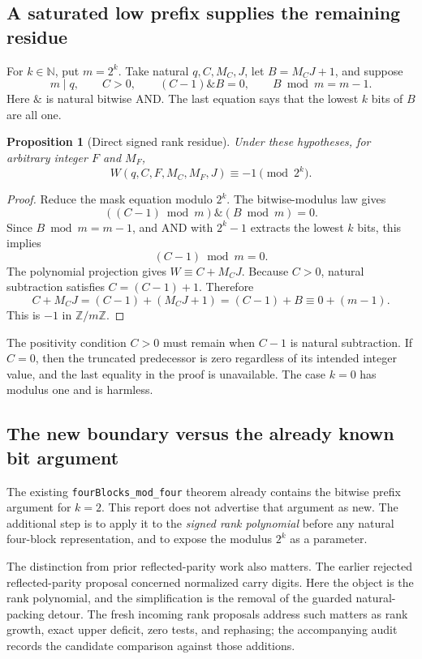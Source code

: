 \documentclass[11pt,a4paper]{article}
\newcommand{\code}[1]{\texttt{#1}}
\newtheorem{proposition}{Proposition}[section]
\begin{document}
\subsection{A saturated low prefix supplies the remaining residue}

For \(k\in\mathbb N\), put \(m=2^k\). Take natural \(q,C,M_C,J\), let \(B=M_CJ+1\), and suppose
\[
 m\mid q,\qquad C>0,\qquad (C-1)\mathbin{\&}B=0,
 \qquad B\bmod m=m-1.
\]
Here \(\mathbin{\&}\) is natural bitwise AND. The last equation says that the lowest \(k\) bits of \(B\) are all one.

\begin{proposition}[Direct signed rank residue]
Under these hypotheses, for arbitrary integer \(F\) and \(M_F\),
\[
 W(q,C,F,M_C,M_F,J)\equiv-1\pmod{2^k}.
\]
\end{proposition}

\begin{proof}
Reduce the mask equation modulo \(2^k\). The bitwise-modulus law gives
\[
 ((C-1)\bmod m)\mathbin{\&}(B\bmod m)=0.
\]
Since \(B\bmod m=m-1\), and AND with \(2^k-1\) extracts the lowest \(k\) bits, this implies
\[
 (C-1)\bmod m=0.
\]
The polynomial projection gives \(W\equiv C+M_CJ\). Because \(C>0\), natural subtraction satisfies \(C=(C-1)+1\). Therefore
\[
 C+M_CJ=(C-1)+(M_CJ+1)=(C-1)+B\equiv0+(m-1).
\]
This is \(-1\) in \(\mathbb Z/m\mathbb Z\).
\end{proof}

The positivity condition \(C>0\) must remain when \(C-1\) is natural subtraction. If \(C=0\), then the truncated predecessor is zero regardless of its intended integer value, and the last equality in the proof is unavailable. The case \(k=0\) has modulus one and is harmless.

\subsection{The new boundary versus the already known bit argument}

The existing \code{fourBlocks\_mod\_four} theorem already contains the bitwise prefix argument for \(k=2\). This report does not advertise that argument as new. The additional step is to apply it to the \emph{signed rank polynomial} before any natural four-block representation, and to expose the modulus \(2^k\) as a parameter.

The distinction from prior reflected-parity work also matters. The earlier rejected reflected-parity proposal concerned normalized carry digits. Here the object is the rank polynomial, and the simplification is the removal of the guarded natural-packing detour. The fresh incoming rank proposals address such matters as rank growth, exact upper deficit, zero tests, and rephasing; the accompanying audit records the candidate comparison against those additions.
\end{document}
